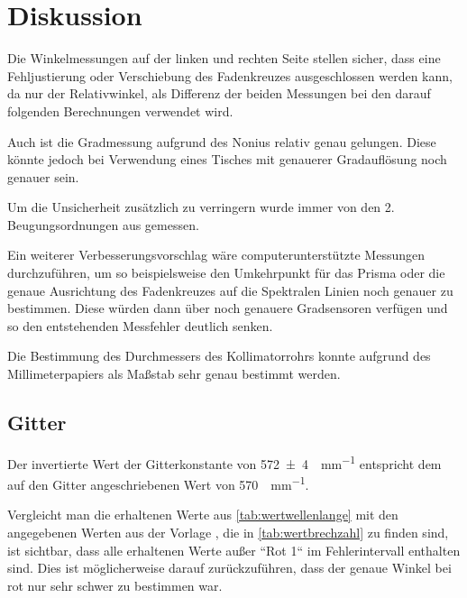 \documentclass[11pt,ngerman]{scrartcl}
\begin{document}
\section{Diskussion}\label{disk}

Die Winkelmessungen auf der linken und rechten Seite stellen sicher, dass eine Fehljustierung oder Verschiebung des Fadenkreuzes ausgeschlossen werden kann, da nur der Relativwinkel, als Differenz der beiden Messungen bei den darauf folgenden Berechnungen verwendet wird.

Auch ist die Gradmessung aufgrund des Nonius relativ genau gelungen. Diese könnte jedoch bei Verwendung eines Tisches mit genauerer Gradauflösung noch genauer sein.

Um die Unsicherheit zusätzlich zu verringern wurde immer von den 2. Beugungsordnungen aus gemessen.

Ein weiterer Verbesserungsvorschlag wäre computerunterstützte Messungen durchzuführen, um so beispielsweise den Umkehrpunkt für das Prisma oder die genaue Ausrichtung des Fadenkreuzes auf die Spektralen Linien noch genauer zu bestimmen. Diese würden dann über noch genauere Gradsensoren verfügen und so den entstehenden Messfehler deutlich senken.

Die Bestimmung des Durchmessers des Kollimatorrohrs konnte aufgrund des Millimeterpapiers als Maßstab sehr genau bestimmt werden.

\subsection{Gitter}

Der invertierte Wert der Gitterkonstante von \SI{572(4)}{\strich\per\mm} entspricht dem auf den Gitter angeschriebenen Wert von \SI{570}{\strich\per\mm}.

Vergleicht man die erhaltenen Werte aus \autoref{tab:wertwellenlange} mit den
angegebenen Werten aus der Vorlage \cite{gitterprismavorlage}, die in
\autoref{tab:wertbrechzahl} zu finden sind, ist sichtbar, dass alle erhaltenen
Werte außer ``Rot 1`` im Fehlerintervall enthalten sind. Dies ist
möglicherweise darauf zurückzuführen, dass der genaue Winkel bei rot nur sehr
schwer zu bestimmen war.


\end{document}
